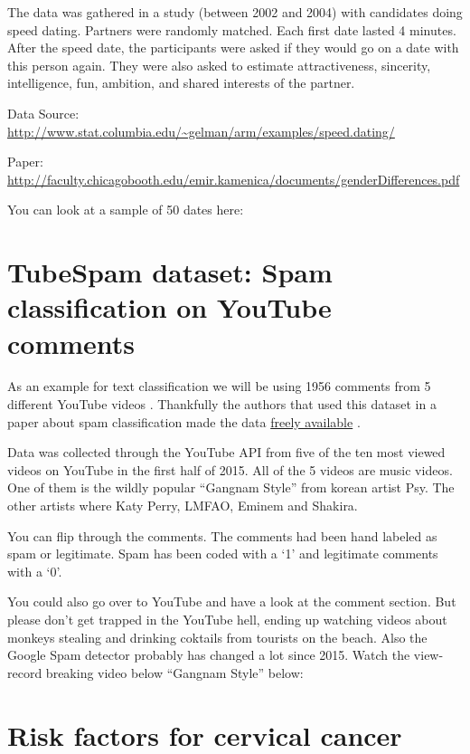 \documentclass[12pt,]{krantz}
\theoremstyle{definition}
\theoremstyle{definition}
\theoremstyle{definition}
\theoremstyle{remark}
\begin{document}
The data was gathered in a study (between 2002 and 2004) with candidates
doing speed dating. Partners were randomly matched. Each first date
lasted 4 minutes. After the speed date, the participants were asked if
they would go on a date with this person again. They were also asked to
estimate attractiveness, sincerity, intelligence, fun, ambition, and
shared interests of the partner.

Data Source:
\url{http://www.stat.columbia.edu/~gelman/arm/examples/speed.dating/}

Paper:
\url{http://faculty.chicagobooth.edu/emir.kamenica/documents/genderDifferences.pdf}

You can look at a sample of 50 dates here:

\hypertarget{htmlwidget-acfbc291d93045d4b13d}{}

\section{TubeSpam dataset: Spam classification on YouTube
comments}\label{TubeSpam}

As an example for text classification we will be using 1956 comments
from 5 different YouTube videos . Thankfully the authors that used this
dataset in a paper about spam classification made the data
\href{http://dcomp.sor.ufscar.br/talmeida/youtubespamcollection/}{freely
available} \citep{alberto2015tubespam}.

Data was collected through the YouTube API from five of the ten most
viewed videos on YouTube in the first half of 2015. All of the 5 videos
are music videos. One of them is the wildly popular ``Gangnam Style''
from korean artist Psy. The other artists where Katy Perry, LMFAO,
Eminem and Shakira.

You can flip through the comments. The comments had been hand labeled as
spam or legitimate. Spam has been coded with a `1' and legitimate
comments with a `0'.

\hypertarget{htmlwidget-0b23377a32b802608300}{}

You could also go over to YouTube and have a look at the comment
section. But please don't get trapped in the YouTube hell, ending up
watching videos about monkeys stealing and drinking coktails from
tourists on the beach. Also the Google Spam detector probably has
changed a lot since 2015. Watch the view-record breaking video below
``Gangnam Style'' below:

\section{Risk factors for cervical
cancer}\label{risk-factors-for-cervical-cancer}
\end{document}

